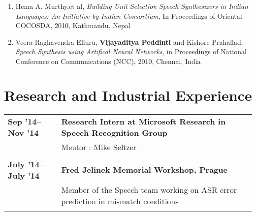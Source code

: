 \documentclass[margin,line,pifont,palatino,courier]{res}
\begin{document}
\begin{resume}
\begin{enumerate}
\item Hema A. Murthy,et al, 
\textit{Building Unit Selection Speech Synthesizers in Indian Languages: An Initiative by Indian Consortium}, In Proceedings of Oriental COCOSDA, 2010, Kathmandu, Nepal

\item Veera Raghavendra Elluru, \textbf{Vijayaditya Peddinti} and Kishore Prahallad.
\textit{Speech Synthesis using Artifical Neural Networks}, in Proceedings of National Conference on Communications (NCC), 2010, Chennai, India
\end{enumerate}
\section{\sc Research and Industrial Experience}

\begin{longtable}{@{}p{1.2in}p{3.8in}}

\textbf{Sep '14--Nov '14} & \textbf{Research Intern at Microsoft Research in Speech Recognition Group} \\
& Mentor : Mike Seltzer \\
&\\

\textbf{July '14--July '14} & \textbf{Fred Jelinek Memorial Workshop, Prague} \\
& Member of the Speech team working on ASR error prediction in mismatch conditions \\
&\\


\end{longtable}
\end{resume}
\end{document}
